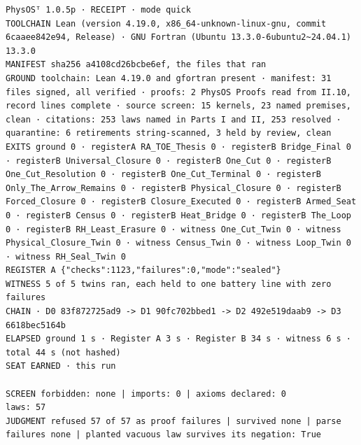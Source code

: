 \documentclass[10pt]{article}
\begin{document}
\begin{Verbatim}[fontsize=\fontsize{5.4}{6.2}\selectfont,breaklines,breakanywhere,breaksymbolleft={}]
PhysOSᵀ 1.0.5p · RECEIPT · mode quick
TOOLCHAIN Lean (version 4.19.0, x86_64-unknown-linux-gnu, commit 6caaee842e94, Release) · GNU Fortran (Ubuntu 13.3.0-6ubuntu2~24.04.1) 13.3.0
MANIFEST sha256 a4108cd26bcbe6ef, the files that ran
GROUND toolchain: Lean 4.19.0 and gfortran present · manifest: 31 files signed, all verified · proofs: 2 PhysOS Proofs read from II.10, record lines complete · source screen: 15 kernels, 23 named premises, clean · citations: 253 laws named in Parts I and II, 253 resolved · quarantine: 6 retirements string-scanned, 3 held by review, clean
EXITS ground 0 · registerA RA_TOE_Thesis 0 · registerB Bridge_Final 0 · registerB Universal_Closure 0 · registerB One_Cut 0 · registerB One_Cut_Resolution 0 · registerB One_Cut_Terminal 0 · registerB Only_The_Arrow_Remains 0 · registerB Physical_Closure 0 · registerB Forced_Closure 0 · registerB Closure_Executed 0 · registerB Armed_Seat 0 · registerB Census 0 · registerB Heat_Bridge 0 · registerB The_Loop 0 · registerB RH_Least_Erasure 0 · witness One_Cut_Twin 0 · witness Physical_Closure_Twin 0 · witness Census_Twin 0 · witness Loop_Twin 0 · witness RH_Seal_Twin 0
REGISTER A {"checks":1123,"failures":0,"mode":"sealed"}
WITNESS 5 of 5 twins ran, each held to one battery line with zero failures
CHAIN · D0 83f872725ad9 -> D1 90fc702bbed1 -> D2 492e519daab9 -> D3 6618bec5164b
ELAPSED ground 1 s · Register A 3 s · Register B 34 s · witness 6 s · total 44 s (not hashed)
SEAT EARNED · this run

SCREEN forbidden: none | imports: 0 | axioms declared: 0
laws: 57
JUDGMENT refused 57 of 57 as proof failures | survived none | parse failures none | planted vacuous law survives its negation: True
\end{Verbatim}
\end{document}
